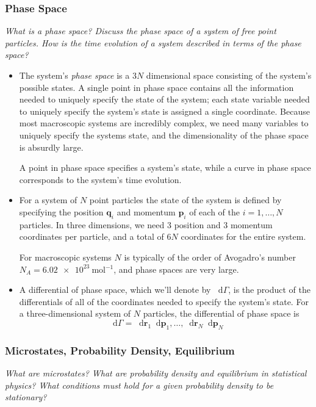 \documentclass[11pt, a4paper]{article}
\newcommand{\diff}{\mathop{}\!\mathrm{d}} %
\begin{document}
\subsubsection{Phase Space}
\textit{What is a phase space? Discuss the phase space of a system of free point particles. How is the time evolution of a system described in terms of the phase space?}
 \begin{itemize}
	 \item The system's \textit{phase space} is a $ 3N $ dimensional space consisting of the system's possible states. A single point in phase space contains all the information needed to uniquely specify the state of the system; each state variable needed to uniquely specify the system's state is assigned a single coordinate. Because most macroscopic systems are incredibly complex, we need many variables to uniquely specify the systems state, and the dimensionality of the phase space is absurdly large. 
	 
	 A point in phase space specifies a system's state, while a curve in phase space corresponds to the system's time evolution.
	 
	 \item For a system of $ N $ point particles the state of the system is defined by specifying the position $ \bm{q}_{i} $ and momentum $ \bm{p}_{i} $ of each of the $ i = 1, \ldots, N $ particles. In three dimensions, we need 3 position and 3 momentum coordinates per particle, and a total of $ 6N $ coordinates for the entire system. 
	 
	 For macroscopic systems $ N $ is typically of the order of Avogadro's number $ N_{A} = \SI{6.02e23}{\mole^{-1}} $, and phase spaces are very large.
	 
	 \item A differential of phase space, which we'll denote by $ \diff \Gamma $, is the product of the differentials of all of the coordinates needed to specify the system's state. For a three-dimensional system of $ N $ particles, the differential of phase space is
	 \begin{equation*}
		 \diff \Gamma = \diff \bm{r}_{1} \diff \bm{p}_{1}, \ldots, \diff \bm{r}_{N} \diff \bm{p}_{N}
	 \end{equation*}
 
 \end{itemize}



\subsubsection{Microstates, Probability Density, Equilibrium}
\textit{What are microstates? What are probability density and equilibrium in statistical physics? What conditions must hold for a given probability density to be stationary?}
 
\end{document}
